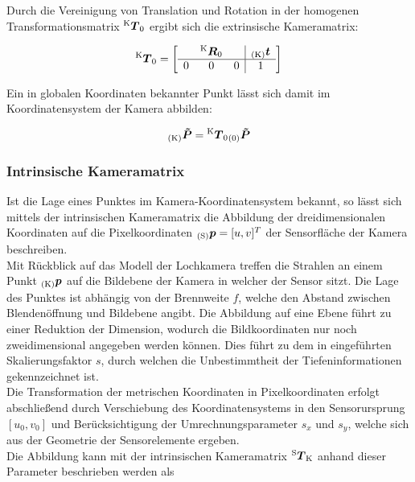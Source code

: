Durch die Vereinigung von Translation und Rotation in der homogenen Transformationsmatrix $\tmat{K}{0}$ ergibt sich die extrinsische Kameramatrix:

\begin{equation}
\tmat{K}{0} = 
\mat{ccc|c}{
  & \rmat{K}{0} &   & \ve{K}{t} \\
\hline
0 &      0      & 0 & 1 \\
}
\end{equation}

Ein in globalen Koordinaten bekannter Punkt lässt sich damit im Koordinatensystem der Kamera abbilden:

\begin{equation}
\ve{K}{\tilde{P}} = \tmat{K}{0}\ve{0}{\tilde{P}}
\end{equation}


\subsubsection{Intrinsische Kameramatrix}
Ist die Lage eines Punktes im Kamera-Koordinatensystem bekannt, so lässt sich mittels der intrinsischen Kameramatrix die Abbildung der dreidimensionalen Koordinaten auf die Pixelkoordinaten $\ve{S}{p} = [u,v]^T$ der Sensorfläche der Kamera beschreiben.\\
Mit Rückblick auf das Modell der Lochkamera treffen die Strahlen an einem Punkt $\ve{K}{{p}}$ auf die Bildebene der Kamera in welcher der Sensor sitzt. Die Lage des Punktes ist abhängig von der Brennweite $f$, welche den Abstand zwischen Blendenöffnung und Bildebene angibt. Die Abbildung auf eine Ebene führt zu einer Reduktion der Dimension, wodurch die Bildkoordinaten nur noch zweidimensional angegeben werden können. Dies führt zu dem in  eingeführten Skalierungsfaktor $s$, durch welchen die Unbestimmtheit der Tiefeninformationen gekennzeichnet ist.\\

Die Transformation der metrischen Koordinaten in Pixelkoordinaten erfolgt abschließend durch Verschiebung des Koordinatensystems in den Sensorursprung $[u_0,v_0]$ und Berücksichtigung der Umrechnungsparameter $s_x$ und $s_y$, welche sich aus der Geometrie der Sensorelemente ergeben.\\
Die Abbildung kann mit der intrinsischen Kameramatrix $\tmat{S}{K}$ anhand dieser Parameter beschrieben werden als

